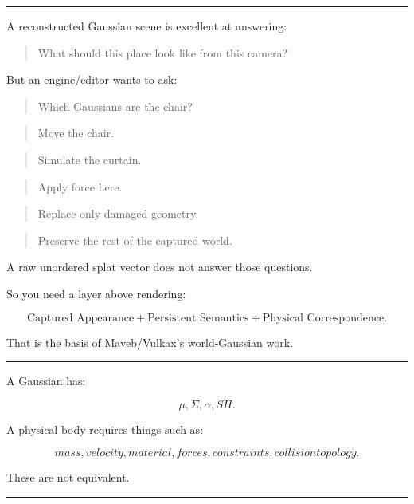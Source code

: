 \begin{center}\rule{0.5\linewidth}{0.5pt}\end{center}

A reconstructed Gaussian scene is excellent at answering:

\begin{quote}
What should this place look like from this camera?
\end{quote}

But an engine/editor wants to ask:

\begin{quote}
Which Gaussians are the chair?
\end{quote}

\begin{quote}
Move the chair.
\end{quote}

\begin{quote}
Simulate the curtain.
\end{quote}

\begin{quote}
Apply force here.
\end{quote}

\begin{quote}
Replace only damaged geometry.
\end{quote}

\begin{quote}
Preserve the rest of the captured world.
\end{quote}

A raw unordered splat vector does not answer those questions.

So you need a layer above rendering:

\[
\boxed{
\text{Captured Appearance}
+
\text{Persistent Semantics}
+
\text{Physical Correspondence}.
}
\]

That is the basis of Maveb/Vulkax's world-Gaussian work.

\begin{center}\rule{0.5\linewidth}{0.5pt}\end{center}

A Gaussian has:

\[
\mu,
\Sigma,
\alpha,
SH.
\]

A physical body requires things such as:

\[
mass,
velocity,
material,
forces,
constraints,
collision topology.
\]

These are not equivalent.

\begin{center}\rule{0.5\linewidth}{0.5pt}\end{center}

